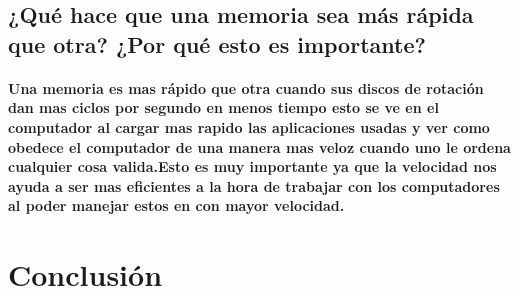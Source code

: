 \documentclass{article}
\begin{document}
\subsection{¿Qué hace que una memoria sea más rápida que otra? ¿Por qué esto es importante?}

\paragraph{Una memoria es mas rápido que otra cuando sus discos de rotación dan mas ciclos por segundo en menos tiempo esto se ve en el computador al cargar mas rapido las aplicaciones usadas y ver como obedece el computador de una manera mas veloz cuando uno le ordena cualquier cosa valida.Esto es muy importante ya que la velocidad nos ayuda a ser mas eficientes a la hora de trabajar con los computadores al poder manejar estos en con mayor velocidad.}

\section{Conclusión} \label{conclulsion}



\end{document}
